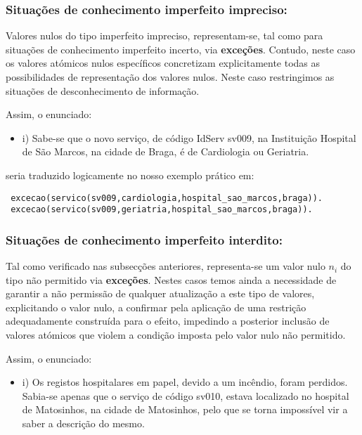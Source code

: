 \documentclass[
  oneside,
  10pt, a4paper,
  footinclude=true,
  headinclude=true,
  cleardoublepage=empty
]{scrbook}
\begin{document}
\subsubsection{\textbf{Situações de conhecimento imperfeito impreciso:}}


        
        
Valores nulos do tipo imperfeito impreciso, representam-se, tal como para situações de conhecimento imperfeito incerto, via \textbf{exceções}. Contudo, neste caso os valores atómicos nulos específicos concretizam explicitamente todas as possibilidades de representação dos valores nulos. Neste caso restringimos as situações de desconhecimento de informação.\par 


Assim, o enunciado: 
\begin{itemize}
\item i) Sabe-se que o novo serviço, de código IdServ sv009, na Instituição Hospital de São Marcos, na cidade de Braga, é de Cardiologia ou Geriatria.
\end{itemize}

seria traduzido logicamente  no nosso exemplo prático em:
\begin{lstlisting}
 excecao(servico(sv009,cardiologia,hospital_sao_marcos,braga)).
 excecao(servico(sv009,geriatria,hospital_sao_marcos,braga)).
\end{lstlisting}

\subsubsection{\textbf{Situações de conhecimento imperfeito interdito:}}

Tal como verificado nas subsecções anteriores, representa-se um valor nulo $n_{i}$ do tipo não permitido via \textbf{exceções}. Nestes casos temos ainda a necessidade de garantir a não permissão de qualquer atualização a este tipo de valores, explicitando o valor nulo,
a confirmar pela aplicação de uma restrição adequadamente construída para o efeito, impedindo a posterior inclusão de valores atómicos que violem a condição imposta pelo valor nulo não permitido.

Assim, o enunciado: 
\begin{itemize}
\item i) Os registos hospitalares em papel, devido a um incêndio, foram perdidos. Sabia-se apenas que o serviço de código sv010, estava localizado no hospital de Matosinhos, na cidade de Matosinhos, pelo que se torna impossível vir a saber a descrição do mesmo.
\end{itemize}
\end{document}
